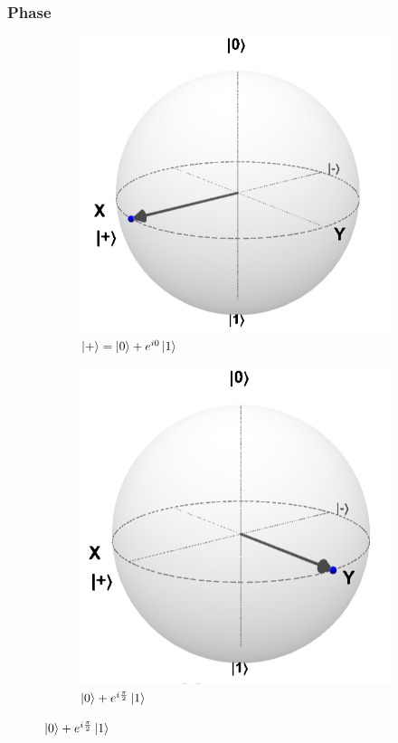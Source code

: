 \documentclass{beamer}
\newcommand{\kz}{\ket{0}}
\newcommand{\ko}{\ket{1}}
\begin{document}
\begin{frame}%
\frametitle{Phase}
\begin{figure}
\begin{subfigure}{0.49\textwidth}
\centering
\includegraphics[scale=0.25]{ket+}
\caption*{$\ket{+} = \kz + e^{i0}\ko$}
\end{subfigure}
\begin{subfigure}{0.49\textwidth}
\centering
\includegraphics[scale=0.15]{zero+ione}
\caption*{$\kz + e^{i\frac{\pi}{2}}\ko$}
\end{subfigure}
\end{figure}



\end{frame}
\end{document}
